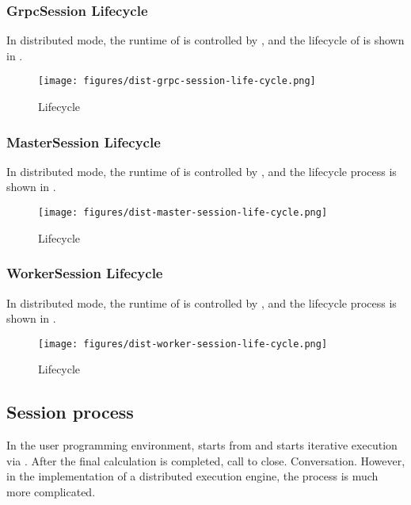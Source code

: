 \begin{content}
\subsubsection{GrpcSession Lifecycle}
In distributed mode, the runtime of  is controlled by , and the lifecycle of  is shown in .

\begin{figure}[H]
  \centering
  \texttt{[image: figures/dist-grpc-session-life-cycle.png]}
  \caption{Lifecycle}
  \label{fig:dist-grpc-session-life-cycle}
\end{figure}


\subsubsection{MasterSession Lifecycle}
In distributed mode, the runtime of  is controlled by , and the  lifecycle process is shown in .

\begin{figure}[H]
  \centering
  \texttt{[image: figures/dist-master-session-life-cycle.png]}
  \caption{Lifecycle}
  \label{fig:dist-master-session-life-cycle}
\end{figure}


\subsubsection{WorkerSession Lifecycle}
In distributed mode, the runtime of  is controlled by , and the  lifecycle process is shown in .

\begin{figure}[H]
  \centering
  \texttt{[image: figures/dist-worker-session-life-cycle.png]}
  \caption{Lifecycle}
  \label{fig:dist-worker-session-life-cycle}
\end{figure}


\subsection{Session process}
In the user programming environment,  starts from  and starts iterative execution via . After the final calculation is completed, call  to close. Conversation. However, in the implementation of a distributed execution engine, the process is much more complicated.


\end{content}
